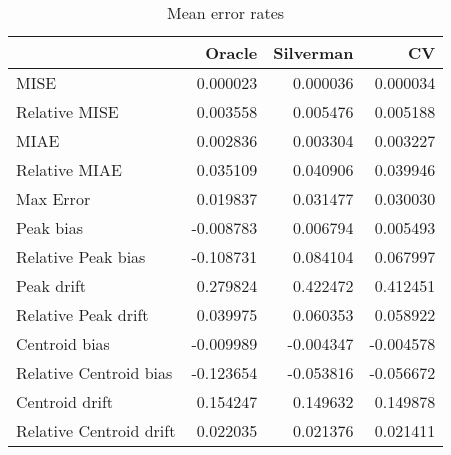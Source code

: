 \begin{table}[H]
\centering
\begin{tabular}{lrrr}
  \hline
 & Oracle & Silverman & CV \\ 
  \hline
MISE & 0.000023 & 0.000036 & 0.000034 \\ 
  Relative MISE & 0.003558 & 0.005476 & 0.005188 \\ 
  MIAE & 0.002836 & 0.003304 & 0.003227 \\ 
  Relative MIAE & 0.035109 & 0.040906 & 0.039946 \\ 
  Max Error & 0.019837 & 0.031477 & 0.030030 \\ 
  Peak bias & -0.008783 & 0.006794 & 0.005493 \\ 
  Relative Peak bias & -0.108731 & 0.084104 & 0.067997 \\ 
  Peak drift & 0.279824 & 0.422472 & 0.412451 \\ 
  Relative Peak drift & 0.039975 & 0.060353 & 0.058922 \\ 
  Centroid bias & -0.009989 & -0.004347 & -0.004578 \\ 
  Relative Centroid bias & -0.123654 & -0.053816 & -0.056672 \\ 
  Centroid drift & 0.154247 & 0.149632 & 0.149878 \\ 
  Relative Centroid drift & 0.022035 & 0.021376 & 0.021411 \\ 
   \hline
\end{tabular}
\caption{Mean error rates} 
\label{tbl:mean_error_rates}
\end{table}
